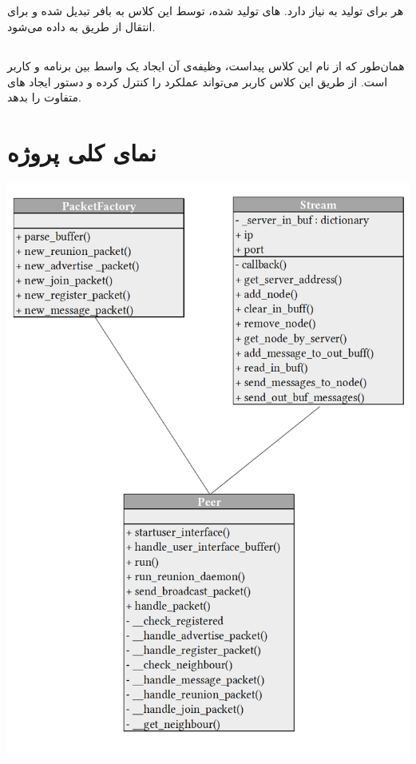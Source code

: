 \documentclass{article}
\begin{document}
\subsection{}
هر  برای تولید  به  نیاز دارد. های تولید شده، توسط این کلاس به بافر تبدیل شده و برای انتقال از طریق  به  داده می‌شود.



\subsection{}
همان‌طور که از نام این کلاس پیداست، وظیفه‌ی آن ایجاد یک واسط بین برنامه و کاربر است. از طریق این کلاس کاربر می‌تواند عملکرد  را کنترل کرده و دستور ایجاد های متفاوت را بدهد.



\newpage
\section{نمای کلی پروژه}
	
\begin{center}
	\vspace*{1cm}
	\includegraphics[scale=0.7]{UML1}
\end{center}
\end{document}
